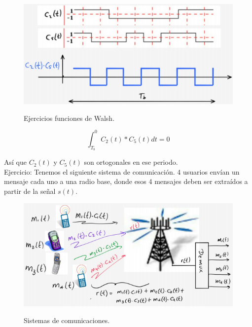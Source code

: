 \begin{figure}[h!]
	\captionsetup{justification = raggedright, singlelinecheck = false}
	\caption{ Ejercicios funciones de Walsh.} 
	\centering
	\includegraphics[scale=1]{Imagenes/Funcion-dos.png}
	\label{fig:Funciones-dos}
\end{figure}

\begin{equation} \label{capseis_siete}
\int_{T_{b}}^0 C_{2}(t)*C_{5}(t)dt=0
\end{equation}

Así que $C_{2}(t)$ y $C_{5}(t)$ son ortogonales en ese periodo. \\

Ejercicio: Tenemos el siguiente sistema de comunicación. 4 usuarios envían un mensaje cada uno a una radio base, donde esos 4 mensajes deben ser extraídos a partir de la señal $s(t)$.\\

\vspace{200px}
\begin{figure}[h!]
	\captionsetup{justification = raggedright, singlelinecheck = false}
	\caption{Sistemas de comunicaciones.} 
	\centering
	\includegraphics[scale=1]{Imagenes/Demux.png}
	\label{fig:Demux}
\end{figure}

